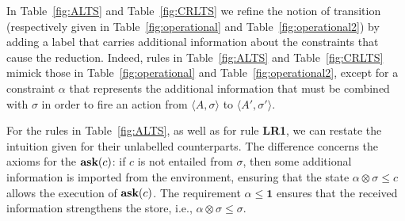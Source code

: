 \documentclass{llncs}
\def\1{{\mathbf 1}}
\newcommand{\ask}{{\bf ask}}
\newcommand{\ostop}{{\bf stop}}
\newcommand{\rarrow}{\rightarrow}
\def\1{{\mathbf 1}}
\begin{document}

In Table~\ref{fig:ALTS} and Table~\ref{fig:CRLTS} we refine the notion of transition (respectively given in Table~\ref{fig:operational} and Table~\ref{fig:operational2})
by adding a label that carries additional information about the constraints that cause the reduction.
Indeed, rules in Table~\ref{fig:ALTS} and Table~\ref{fig:CRLTS} mimick those in Table~\ref{fig:operational} and Table~\ref{fig:operational2}, except for a constraint $\alpha$ that
represents the additional information that must be combined with $\sigma$ in order to fire an action
from $\langle A, \sigma\rangle$  to $\langle A', \sigma' \rangle$.

For the rules in Table~\ref{fig:ALTS}, as well as for rule {\bf  LR1}, we can restate the intuition given for their unlabelled counterparts. 
The difference concerns the axioms for the $\hbox{\ask}(c)$: if $c$ is not entailed from $\sigma$, then
some additional information  is imported from the environment, ensuring that the state
$\alpha \otimes \sigma \leq c$ allows the execution of $\hbox{\ask}(c)$.
The requirement $\alpha \leq \1$ ensures that the received information strengthens the store, 
i.e., $\alpha \otimes \sigma \leq \sigma$.
\todo{$\alpha \leq \1$ si pu\`o rimuovere}
\end{document}
